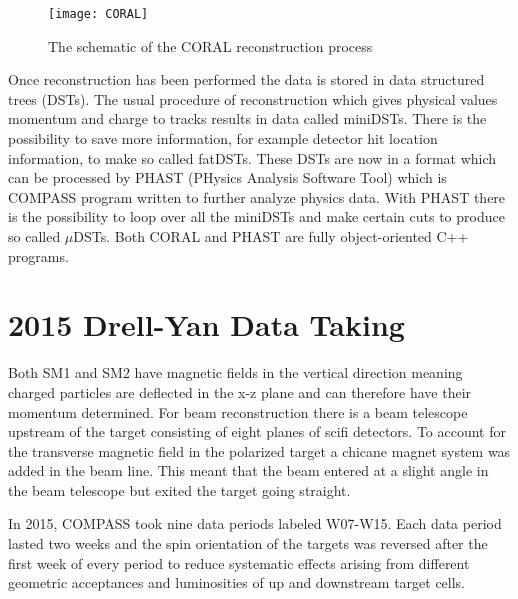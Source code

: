 \begin{figure}[h!t]
  \centering
  \texttt{[image: CORAL]}
  \caption{The schematic of the CORAL reconstruction process}
  \label{fig::CORAL}
\end{figure}

Once reconstruction has been performed the data is stored in data structured
trees (DSTs).  The usual procedure of reconstruction which gives physical values
momentum and charge to tracks results in data called miniDSTs.  There is the
possibility to save more information, for example detector hit location
information, to make so called fatDSTs.  These DSTs are now in a format which
can be processed by PHAST (PHysics Analysis Software Tool) which is COMPASS
program written to further analyze physics data.  With PHAST there is the
possibility to loop over all the miniDSTs and make certain cuts to produce so
called $\mu$DSTs.  Both CORAL and PHAST are fully object-oriented C++
programs. \par


\section{2015 Drell-Yan Data Taking}


Both SM1 and SM2 have magnetic
fields in the vertical direction meaning charged particles are deflected in the
x-z plane and can therefore have their momentum determined.  For beam
reconstruction there is a beam telescope upstream of the target consisting of
eight planes of scifi detectors.  To account for the transverse magnetic field
in the polarized target a chicane magnet system was added in the beam line.
This meant that the beam entered at a slight angle in the beam telescope but
exited the target going straight. \par

In 2015, COMPASS took nine data periods labeled W07-W15.  Each data period
lasted two weeks and the spin orientation of the targets was reversed after the
first week of every period to reduce systematic effects arising from different
geometric acceptances and luminosities of up and downstream target cells.

